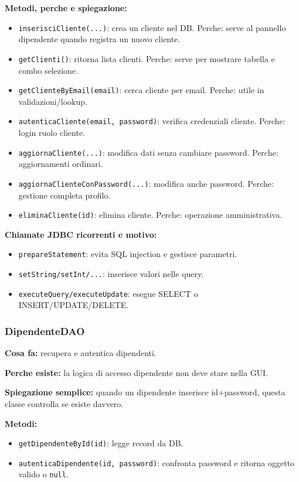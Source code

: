 \documentclass[12pt,a4paper]{article}
\begin{document}
\textbf{Metodi, perche e spiegazione:}
\begin{itemize}
  \item \texttt{inserisciCliente(...)}: crea un cliente nel DB. Perche: serve al pannello dipendente quando registra un nuovo cliente.
  \item \texttt{getClienti()}: ritorna lista clienti. Perche: serve per mostrare tabella e combo selezione.
  \item \texttt{getClienteByEmail(email)}: cerca cliente per email. Perche: utile in validazioni/lookup.
  \item \texttt{autenticaCliente(email, password)}: verifica credenziali cliente. Perche: login ruolo cliente.
  \item \texttt{aggiornaCliente(...)}: modifica dati senza cambiare password. Perche: aggiornamenti ordinari.
  \item \texttt{aggiornaClienteConPassword(...)}: modifica anche password. Perche: gestione completa profilo.
  \item \texttt{eliminaCliente(id)}: elimina cliente. Perche: operazione amministrativa.
\end{itemize}

\textbf{Chiamate JDBC ricorrenti e motivo:}
\begin{itemize}
  \item \texttt{prepareStatement}: evita SQL injection e gestisce parametri.
  \item \texttt{setString/setInt/...}: inserisce valori nelle query.
  \item \texttt{executeQuery/executeUpdate}: esegue SELECT o INSERT/UPDATE/DELETE.
\end{itemize}

\subsubsection*{DipendenteDAO}
\textbf{Cosa fa:}
recupera e autentica dipendenti.

\textbf{Perche esiste:}
la logica di accesso dipendente non deve stare nella GUI.

\textbf{Spiegazione semplice:}
quando un dipendente inserisce id+password, questa classe controlla se esiste davvero.

\textbf{Metodi:}
\begin{itemize}
  \item \texttt{getDipendenteById(id)}: legge record da DB.
  \item \texttt{autenticaDipendente(id, password)}: confronta password e ritorna oggetto valido o \texttt{null}.
\end{itemize}
\end{document}
